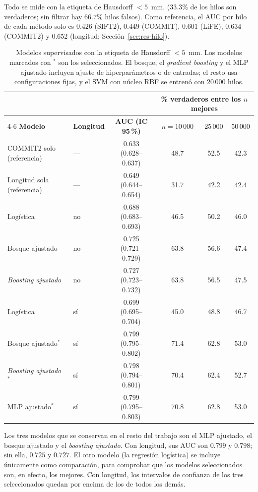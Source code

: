 \documentclass[11pt,a4paper]{article}
\begin{document}
Todo se mide con la etiqueta de Hausdorff  $<5$~mm. ($33.3\%$ de los hilos son verdaderos; sin filtrar hay
$66.7\%$ hilos falsos). Como referencia, el AUC por hilo de cada método solo es $0.426$ (SIFT2), $0.449$ (COMMIT), $0.601$ (LiFE), $0.634$ (COMMIT2) y $0.652$ (longitud; Secci\'on~\ref{sec:res-hilo}).

\begin{table}[H]
\centering
\footnotesize
\begin{tabular}{@{}llcccc@{}}
\toprule
 & & & \multicolumn{3}{c}{\textbf{\% verdaderos entre los $n$ mejores}}\\
\cmidrule(l){4-6}
\textbf{Modelo} & \textbf{Longitud} & \textbf{AUC (IC 95\,\%)} & $n=10\,000$ & 25\,000 & 50\,000\\
\midrule
COMMIT2 solo (referencia)   & --- & 0.633 (0.628--0.637) & 48.7 & 52.5 & 42.3\\
Longitud sola (referencia)  & --- & 0.649 (0.644--0.654) & 31.7 & 42.2 & 42.4\\
\addlinespace
Log\'istica                      & no  & 0.688 (0.683--0.693) & 46.5 & 50.2 & 46.0\\

Bosque ajustado        & no  & 0.725 (0.721--0.729) & 63.8 & 56.6 & 47.4\\
\textit{Boosting ajustado} & no  & 0.727 (0.723--0.732) & 63.8 & 56.5 & 47.5\\

Log\'istica                      & s\'i & 0.699 (0.695--0.704) & 45.0 & 48.8 & 46.7\\
Bosque ajustado$^{*}$           & s\'i & 0.799 (0.795--0.802) & 71.4 & 62.8 & 53.0\\
\textit{Boosting ajustado }$^{*}$ & s\'i & 0.798 (0.794--0.801) & 70.4 & 62.4 & 52.7\\
MLP ajustado$^{*}$               & s\'i & 0.799 (0.795--0.803) & 70.8 & 62.8 & 53.0\\
\bottomrule
\end{tabular}
\caption{Modelos supervisados con la etiqueta de Hausdorff $<5$~mm. Los modelos marcados con $^{*}$ son los seleccionados. El bosque, el \textit{gradient boosting} y el MLP ajustado incluyen ajuste de hiperparámetros o de entradas; el resto usa configuraciones fijas, y el SVM con n\'ucleo RBF se entren\'o con $20\,000$ hilos.}
\label{tab:modelos}
\end{table}

Los tres modelos que se conservan en el resto del trabajo son el MLP ajustado, el bosque ajustado y el \textit{boosting ajustado}. Con longitud, sus AUC son $0.799$ y $0.798$; sin ella, $0.725$ y $0.727$. El otro modelo (la regresi\'on log\'istica) se incluye únicamente como comparación, para comprobar que los modelos seleccionados son, en efecto, los mejores. Con longitud, los intervalos de confianza de los tres seleccionados quedan por encima de los de todos los demás.  
\end{document}
